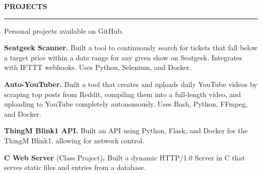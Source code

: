 \documentclass[10pt,letterpaper]{article}
\begin{document}

\medskip
\MakeUppercase{{\bf Projects}} %
\medskip
\hrule %
\begin{list}{}{\setlength{\leftmargin}{0em}}
\item %
\vspace{-1.25em}
\item {Personal projects available on GitHub. }
\item \textbf{Seatgeek Scanner.} {Built a tool to continuously search for tickets that fall below a target price within a date range for any given show on Seatgeek. Integrates with IFTTT webhooks. Uses Python, Selenium, and Docker. }
\item \textbf{Auto-YouTuber.} {Built a tool that creates and uploads daily YouTube videos by scraping top posts from Reddit, compiling them into a full-length video, and uploading to YouTube completely autonomously. Uses Bash, Python, FFmpeg, and Docker. }
\item \textbf{ThingM Blink1 API.} {Built an API using Python, Flask, and Docker for the ThingM Blink1, allowing for network control.}
\item \textbf{C Web Server} {(Class Project)\textbf{.} Built a dynamic HTTP/1.0 Server in C that serves static files and entries from a database.}
\end{list}

\end{document}
